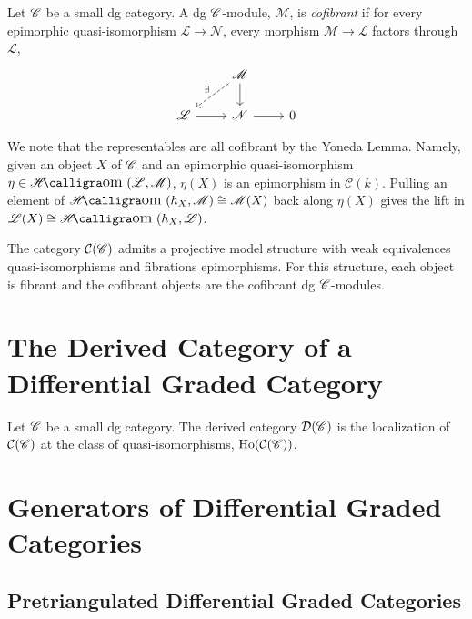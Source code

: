\documentclass[dissertation.tex]{subfiles}
\begin{document}
\begin{defn}
  Let $\mathscr{C}$ be a small dg category.
  A dg $\mathscr{C}$-module, $\mathscr{M}$, is {\it cofibrant} if for every epimorphic quasi-isomorphism $\mathscr{L} \rightarrow \mathscr{N}$, every morphism $\mathscr{M} \rightarrow \mathscr{L}$ factors through $\mathscr{L}$,
  $$\begin{tikzcd}
    & \mathscr{M}\arrow{d}\arrow[dashed,swap]{ld}{\exists}\\
    \mathscr{L} \arrow{r} & \mathscr{N} \arrow{r} & 0
  \end{tikzcd}$$
\end{defn}

\begin{rmk}
  We note that the representables are all cofibrant by the Yoneda Lemma.
  Namely, given an object $X$ of $\mathscr{C}$ and an epimorphic quasi-isomorphism $\eta \in \SHom{\mathscr{L},\mathscr{M}}$, $\eta(X)$ is an epimorphism in $\mathcal{C}(k)$.
  Pulling an element of $\SHom{h_X, \mathscr{M}} \cong \mathscr{M}(X)$ back along $\eta(X)$ gives the lift in $\mathscr{L}(X) \cong \SHom{h_X, \mathscr{L}}$.
\end{rmk}

\begin{thm}
  The category $\mathcal{C}(\mathscr{C})$ admits a projective model structure with weak equivalences quasi-isomorphisms and fibrations epimorphisms.
  For this structure, each object is fibrant and the cofibrant objects are the cofibrant dg $\mathscr{C}$-modules.
\end{thm}

\section{The Derived Category of a Differential Graded Category}

\begin{defn}
  Let $\mathscr{C}$ be a small dg category.
  The derived category $\mathcal{D}(\mathscr{C})$ is the localization of $\mathcal{C}(\mathscr{C})$ at the class of quasi-isomorphisms, $\operatorname{Ho}(\mathcal{C}(\mathscr{C}))$.
\end{defn}

\section{Generators of Differential Graded Categories}
\subsection{Pretriangulated Differential Graded Categories}
\end{document}

